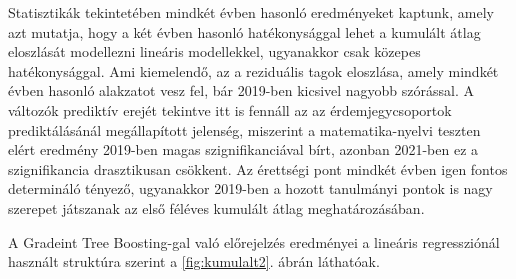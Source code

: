\documentclass[12pt]{article}
\begin{document}
\noindent Statisztikák tekintetében mindkét évben hasonló eredményeket kaptunk, amely azt mutatja, hogy a két évben hasonló hatékonysággal lehet a kumulált átlag eloszlását modellezni lineáris modellekkel, ugyanakkor csak közepes hatékonysággal. Ami kiemelendő, az a reziduális tagok eloszlása, amely mindkét évben hasonló alakzatot vesz fel, bár 2019-ben kicsivel nagyobb szórással. A változók prediktív erejét tekintve itt is fennáll az az érdemjegycsoportok prediktálásánál megállapított jelenség, miszerint a matematika-nyelvi teszten elért eredmény 2019-ben magas szignifikanciával bírt, azonban 2021-ben ez a szignifikancia drasztikusan csökkent. Az érettségi pont mindkét évben igen fontos determináló tényező, ugyanakkor 2019-ben a hozott tanulmányi pontok is nagy szerepet játszanak az első féléves kumulált átlag meghatározásában.

A Gradeint Tree Boosting-gal való előrejelzés eredményei a lineáris regressziónál használt struktúra szerint a \ref{fig:kumulalt2}. ábrán láthatóak. 
\end{document}
